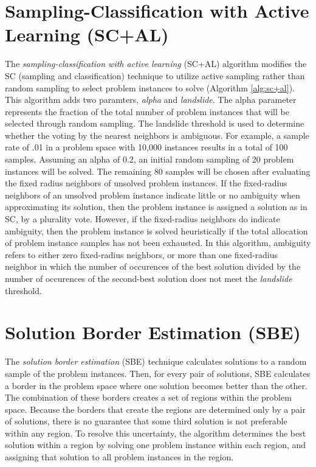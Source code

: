 \section{Sampling-Classification with Active Learning (SC+AL)}
The \textit {sampling-classification with active learning} (SC+AL) algorithm modifies the SC (sampling and classification) technique to utilize active sampling rather than random sampling to select problem instances to solve (Algorithm \ref{alg:sc+al}).  This algorithm adds two paramters, \textit{alpha} and \textit{landslide}.  The alpha parameter represents the fraction of the total number of problem instances that will be selected through random sampling.   The landslide threshold is used to determine whether the voting by the nearest neighbors is ambiguous.  For example, a sample rate of .01 in a problem space with 10,000 instances results in a total of 100 samples.  Assuming an alpha of 0.2, an initial random sampling of 20 problem instances will be solved.  The remaining 80 samples will be  chosen after evaluating the fixed radius neighbors of unsolved problem instances. If the fixed-radius neighbors of an unsolved problem instance indicate little or no ambiguity when approximating its solution, then the problem instance is assigned a solution as in SC, by a plurality vote.  However, if the fixed-radius neighbors do indicate ambiguity, then the problem instance is solved heuristically if the total allocation of problem instance samples has not been exhausted.  In this algorithm, ambiguity refers to either zero fixed-radius neighbors, or more than one fixed-radius neighbor in which the number of occurences of the best solution divided by the number of occurences of the second-best solution does not meet the \textit{landslide} threshold.



\section{Solution Border Estimation (SBE)}
The \textit{solution border estimation} (SBE) technique calculates solutions to a random sample of the problem instances.  Then, for every pair of solutions, SBE calculates a border in the problem space where one solution becomes better than the other.  The combination of these borders creates a set of regions within the problem space.  Because the borders that create the regions are determined only by a pair of solutions, there is no guarantee that some third solution is not preferable within any region.  To resolve this uncertainty, the algorithm determines the best solution within a region by solving one problem instance within each region, and assigning that solution to all problem instances in the region.  

